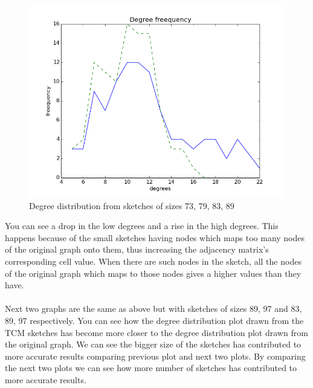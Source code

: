 \documentclass[12pt]{report}
\numberwithin{figure}{section}
\numberwithin{table}{section}
\begin{document}
\begin{figure}[H]
\centering
\includegraphics[scale=0.8]{images/dd1}
\caption{Degree distribution from sketches of sizes 73, 79, 83, 89}
\end{figure}

You can see a drop in the low degrees and a rise in the high degrees. This happens because of the small sketches having nodes which maps too many nodes of the original graph onto them, thus increasing the adjacency matrix’s corresponding cell value. When there are such nodes in the sketch, all the nodes of the original graph which maps to those nodes gives a higher values than they have. 

\paragraph{}

Next two graphs are the same as above but with sketches  of sizes 89, 97 and 83, 89, 97 respectively. You can see how the degree distribution plot drawn from the TCM sketches has become more closer to the degree distribution plot drawn from the original graph. We can see the bigger size of the sketches has contributed to more accurate results comparing previous plot and next two plots. By comparing the next two plots we can see how more number of sketches has contributed to more accurate results.
\end{document}
